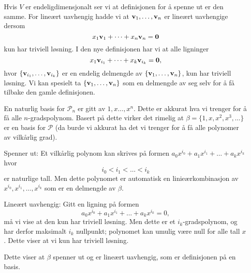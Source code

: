 \begin{losning}


\begin{punkt}
Hvis $V$ er endeligdimensjonalt ser vi at definisjonen for å spenne ut er den samme. For lineært uavhengig hadde vi at $\mathbf{v}_1,\dots,\mathbf{v}_n$ er lineært uavhengige dersom $$x_1\mathbf{v}_1+\dots+x_n\mathbf{v}_n=\mathbf{0}$$ kun har triviell løsning. I den nye definisjonen har vi at alle ligninger $$x_1\mathbf{v}_{i_1}+\dots+x_k\mathbf{v}_{i_k}=\mathbf{0},$$ hvor $\{\mathbf{v}_{i_1},\dots,\mathbf{v}_{i_k}\}$ er en endelig delmengde av $\{\mathbf{v}_1,\dots,\mathbf{v}_n\}$, kun har triviell løsning. Vi kan spesielt ta $\{\mathbf{v}_1,\dots,\mathbf{v}_n\}$ som en delmengde av seg selv for å få tilbake den gamle definisjonen.
\end{punkt}

\begin{punkt}
En naturlig basis for $\mathcal{P}_n$ er gitt av $1,x\dots,x^n$. Dette er akkurat hva vi trenger for å få alle $n$-gradspolynom. Basert på dette virker det rimelig at $\beta=\{1,x,x^2,x^3,\dots\}$ er en basis for $\mathcal{P}$ (da burde vi akkurat ha det vi trenger for å få alle polynomer av vilkårlig grad). 
\end{punkt}

\begin{punkt}
Spenner ut: Et vilkårlig polynom kan skrives på formen $a_0x^{i_0}+a_1x^{i_1}+\dots +a_kx^{i_k}$ hvor $$i_0<i_1<\dots<i_k$$ er naturlige tall. Men dette polynomet er automatisk en linieærkombinasjon av $x^{i_0},x^{i_1},\dots,x^{i_k}$ som er en delmengde av $\beta$.

\noindent
Lineært uavhengig: Gitt en ligning på formen $$a_0x^{i_0}+a_1x^{i_1}+\dots +a_kx^{i_k}=0,$$ må vi vise at den kun har triviell løsning. Men dette er et $i_k$-gradspolynom, og har derfor maksimalt $i_k$ nullpunkt; polynomet kan umulig være null for alle tall $x$. Dette viser at vi kun har triviell løsning.

\noindent
Dette viser at $\beta$ spenner ut og er lineært uavhengig, som er definisjonen på en basis.
\end{punkt}

\end{losning}







